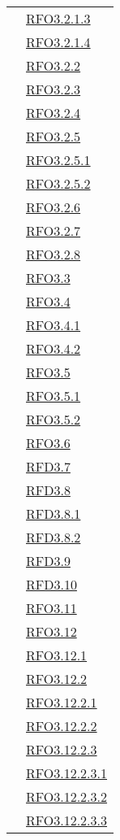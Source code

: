 \begin{longtable}{|>{\centering}m{5cm}|m{5cm}<{\centering}|}
& \hyperlink{RFO3.2.1.3}{RFO3.2.1.3}\\
& \hyperlink{RFO3.2.1.4}{RFO3.2.1.4}\\
& \hyperlink{RFO3.2.2}{RFO3.2.2}\\
& \hyperlink{RFO3.2.3}{RFO3.2.3}\\
& \hyperlink{RFO3.2.4}{RFO3.2.4}\\
& \hyperlink{RFO3.2.5}{RFO3.2.5}\\
& \hyperlink{RFO3.2.5.1}{RFO3.2.5.1}\\
& \hyperlink{RFO3.2.5.2}{RFO3.2.5.2}\\
& \hyperlink{RFO3.2.6}{RFO3.2.6}\\
& \hyperlink{RFO3.2.7}{RFO3.2.7}\\
& \hyperlink{RFO3.2.8}{RFO3.2.8}\\
& \hyperlink{RFO3.3}{RFO3.3}\\
& \hyperlink{RFO3.4}{RFO3.4}\\
& \hyperlink{RFO3.4.1}{RFO3.4.1}\\
& \hyperlink{RFO3.4.2}{RFO3.4.2}\\
& \hyperlink{RFO3.5}{RFO3.5}\\
& \hyperlink{RFO3.5.1}{RFO3.5.1}\\
& \hyperlink{RFO3.5.2}{RFO3.5.2}\\
& \hyperlink{RFO3.6}{RFO3.6}\\
& \hyperlink{RFD3.7}{RFD3.7}\\
& \hyperlink{RFD3.8}{RFD3.8}\\
& \hyperlink{RFD3.8.1}{RFD3.8.1}\\
& \hyperlink{RFD3.8.2}{RFD3.8.2}\\
& \hyperlink{RFD3.9}{RFD3.9}\\
& \hyperlink{RFD3.10}{RFD3.10}\\
& \hyperlink{RFO3.11}{RFO3.11}\\
& \hyperlink{RFO3.12}{RFO3.12}\\
& \hyperlink{RFO3.12.1}{RFO3.12.1}\\
& \hyperlink{RFO3.12.2}{RFO3.12.2}\\
& \hyperlink{RFO3.12.2.1}{RFO3.12.2.1}\\
& \hyperlink{RFO3.12.2.2}{RFO3.12.2.2}\\
& \hyperlink{RFO3.12.2.3}{RFO3.12.2.3}\\
& \hyperlink{RFO3.12.2.3.1}{RFO3.12.2.3.1}\\
& \hyperlink{RFO3.12.2.3.2}{RFO3.12.2.3.2}\\
& \hyperlink{RFO3.12.2.3.3}{RFO3.12.2.3.3}\\

\end{longtable}
